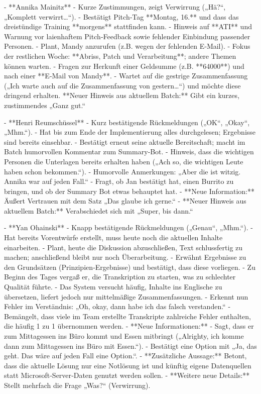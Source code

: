 - **Annika Mainitz**  
  - Kurze Zustimmungen, zeigt Verwirrung („Hä?“, „Komplett verwirrt…“).  
  - Bestätigt Pitch‑Tag **Montag, 16.** und dass das dreistündige Training **morgens** stattfinden kann.  
  - Hinweis auf **ATI** und Warnung vor laienhaftem Pitch‑Feedback sowie fehlender Einbindung passender Personen.  
  - Plant, Mandy anzurufen (z.B. wegen der fehlenden E‑Mail).  
  - Fokus der restlichen Woche: **Abriss, Patch und Verarbeitung**; andere Themen können warten.  
  - Fragen zur Herkunft einer Geldsumme (z.B. **64000**) und nach einer **E‑Mail von Mandy**.  
  - Wartet auf die gestrige Zusammenfassung („Ich warte auch auf die Zusammenfassung von gestern…“) und möchte diese dringend erhalten.  
  **Neuer Hinweis aus aktuellem Batch:** Gibt ein kurzes, zustimmendes „Ganz gut.“  

- **Henri Reumschüssel**  
  - Kurz bestätigende Rückmeldungen („OK“, „Okay“, „Mhm.“).  
  - Hat bis zum Ende der Implementierung alles durchgelesen; Ergebnisse sind bereits einsehbar.  
  - Bestätigt erneut seine aktuelle Bereitschaft; macht im Batch humorvollen Kommentar zum Summary‑Bot.  
  - Hinweis, dass die wichtigen Personen die Unterlagen bereits erhalten haben („Ach so, die wichtigen Leute haben schon bekommen.“).  
  - Humorvolle Anmerkungen: „Aber die ist witzig. Annika war auf jeden Fall.“  
  - Fragt, ob Jan bestätigt hat, einen Burrito zu bringen, und ob der Summary Bot etwas behauptet hat.  
  - **Neue Information:** Äußert Vertrauen mit dem Satz „Das glaube ich gerne.“  
  - **Neuer Hinweis aus aktuellem Batch:** Verabschiedet sich mit „Super, bis dann.“  


- **Yan Ohainski**  
  - Knapp bestätigende Rückmeldungen („Genau“, „Mhm.“).  
  - Hat bereits Vorentwürfe erstellt, muss heute noch die aktuellen Inhalte einarbeiten.  
  - Plant, heute die Diskussion abzuschließen, Text schlussfertig zu machen; anschließend bleibt nur noch Überarbeitung.  
  - Erwähnt Ergebnisse zu den Grundsätzen (Prinzipien‑Ergebnisse) und bestätigt, dass diese vorliegen.  
  - Zu Beginn des Tages vergaß er, die Transkription zu starten, was zu schlechter Qualität führte.  
  - Das System versucht häufig, Inhalte ins Englische zu übersetzen, liefert jedoch nur mittelmäßige Zusammenfassungen.  
  - Erkennt nun Fehler im Verständnis: „Oh, okay, dann habe ich das falsch verstanden.“  
  - Bemängelt, dass viele im Team erstellte Transkripte zahlreiche Fehler enthalten, die häufig 1 zu 1 übernommen werden.  
  - **Neue Informationen:**  
    - Sagt, dass er zum Mittagessen ins Büro kommt und Essen mitbringt („Alrighty, ich komme dann zum Mittagessen ins Büro mit Essen.“).  
    - Bestätigt eine Option mit „Ja, das geht. Das wäre auf jeden Fall eine Option.“.  
  - **Zusätzliche Aussage:** Betont, dass die aktuelle Lösung nur eine Notlösung ist und künftig eigene Datenquellen statt Microsoft‑Server‑Daten genutzt werden sollen.  
  - **Weitere neue Details:** Stellt mehrfach die Frage „Was?“ (Verwirrung).

